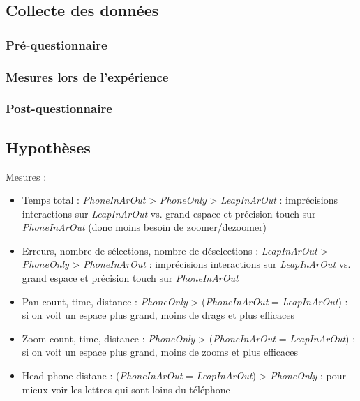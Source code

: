 \subsection{Collecte des données}
\subsubsection{Pré-questionnaire}

\subsubsection{Mesures lors de l'expérience}

\subsubsection{Post-questionnaire}

\subsection{Hypothèses}
Mesures :
\begin{itemize}
  \item Temps total : \textit{PhoneInArOut} > \textit{PhoneOnly} > \textit{LeapInArOut} : imprécisions interactions sur \textit{LeapInArOut} vs. grand espace et précision touch sur \textit{PhoneInArOut} (donc moins besoin de zoomer/dezoomer)
  \item Erreurs, nombre de sélections, nombre de déselections : \textit{LeapInArOut} > \textit{PhoneOnly} > \textit{PhoneInArOut} : imprécisions interactions sur \textit{LeapInArOut} vs. grand espace et précision touch sur \textit{PhoneInArOut}
  \item Pan count, time, distance : \textit{PhoneOnly} > (\textit{PhoneInArOut} = \textit{LeapInArOut}) : si on voit un espace plus grand, moins de drags et plus efficaces
  \item Zoom count, time, distance : \textit{PhoneOnly} > (\textit{PhoneInArOut} = \textit{LeapInArOut}) : si on voit un espace plus grand, moins de zooms et plus efficaces
  \item Head phone distane : (\textit{PhoneInArOut} = \textit{LeapInArOut}) > \textit{PhoneOnly} : pour mieux voir les lettres qui sont loins du téléphone
\end{itemize}

